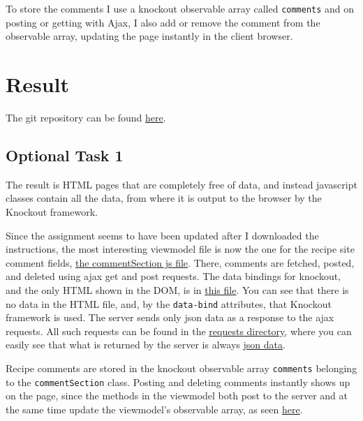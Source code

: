 \documentclass[a4paper]{scrreprt}
\newcommand{\code}[1]{\texttt{#1}}
\begin{document}
To store the comments I use a knockout observable array called \code{comments} and on posting or getting with Ajax, I also add or remove the comment from the observable array, updating the page instantly in the client browser.

\chapter{Result}
\label{sec:result}

The git repository can be found \href{https://github.com/fongie/TastyRecipes/tree/assignment4}{here}.

\section{Optional Task 1}

The result is HTML pages that are completely free of data, and instead javascript classes contain all the data, from where it is output to the browser by the Knockout framework.

Since the assignment seems to have been updated after I downloaded the instructions, the most interesting viewmodel file is now the one for the recipe site comment fields, \href{https://github.com/fongie/TastyRecipes/blob/assignment4/src/view/viewmodel/commentSection.js}{the commentSection js file}. There, comments are fetched, posted, and deleted using ajax get and post requests. The data bindings for knockout, and the only HTML shown in the DOM, is in \href{https://github.com/fongie/TastyRecipes/tree/assignment4/src/view/parts/comments.php}{this file}. You can see that there is no data in the HTML file, and, by the \code{data-bind} attributes, that Knockout framework is used. The server sends only json data as a response to the ajax requests. All such requests can be found in the \href{https://github.com/fongie/TastyRecipes/tree/assignment4/src/view/requests}{requests directory}, where you can easily see that what is returned by the server is always \href{https://github.com/fongie/TastyRecipes/blob/b3511142454b98a722c9f1fa76f3680c740ec1b4/src/view/requests/get\_comments.php#L8}{json data}.

Recipe comments are stored in the knockout observable array \code{comments} belonging to the \code{commentSection} class. Posting and deleting comments instantly shows up on the page, since the methods in the viewmodel both post to the server and at the same time update the viewmodel's observable array, as seen \href{https://github.com/fongie/TastyRecipes/blob/d5a045f5de354d46aa2ed07f5e2d84885910bad4/src/view/viewmodel/commentSection.js#L45}{here}. 
\end{document}
